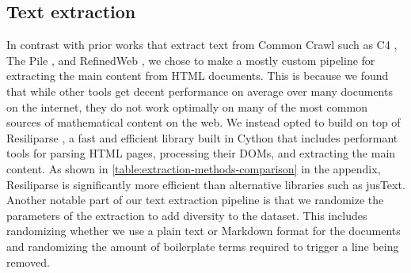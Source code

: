 \subsection{Text extraction}

In contrast with prior works that extract text from Common Crawl such as C4 \citep{collins2023evaluating}, The Pile \citep{gao2020pile}, and RefinedWeb \citep{refined-web}, we chose to make a mostly custom pipeline for extracting the main content from HTML documents. This is because we found that while other tools get decent performance on average over many documents on the internet, they do not work optimally on many of the most common sources of mathematical content on the web. We instead opted to build on top of Resiliparse \citep{bevendorff:2018, bevendorff:2021c}, a fast and efficient library built in Cython that includes performant tools for parsing HTML pages, processing their DOMs, and extracting the main content. As shown in \autoref{table:extraction-methods-comparison} in the appendix, Resiliparse is significantly more efficient than alternative libraries such as jusText. Another notable part of our text extraction pipeline is that we randomize the parameters of the extraction to add diversity to the dataset. This includes randomizing whether we use a plain text or Markdown format for the documents and randomizing the amount of boilerplate terms required to trigger a line being removed.

